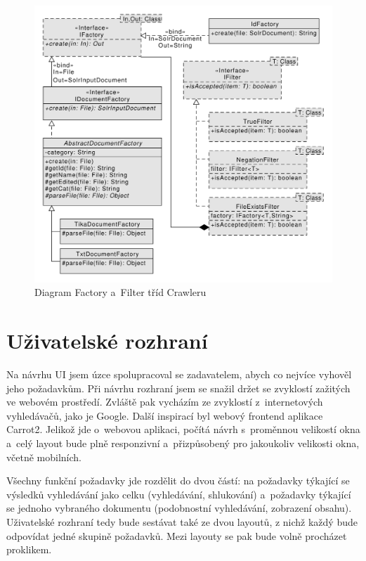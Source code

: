 \begin{figure}[h]
\begin{center}
\includegraphics[width=13cm]{OtherClasses}
\caption{Diagram Factory a~Filter tříd Crawleru}
\label{fig:OtherClasses}
\end{center}
\end{figure}

\section{Uživatelské rozhraní} \label{design_frontend}
Na návrhu UI jsem úzce spolupracoval se zadavatelem, abych co nejvíce vyhověl jeho požadavkům. Při návrhu rozhraní jsem se snažil držet se zvyklostí zažitých ve webovém prostředí. Zvláště pak vycházím ze zvyklostí z~internetových vyhledávačů, jako je Google. Další inspirací byl webový frontend aplikace Carrot2. Jelikož jde o~webovou aplikaci, počítá návrh s~proměnnou velikostí okna a~celý layout bude plně responzivní a~přizpůsobený pro jakoukoliv velikosti okna, včetně mobilních.

Všechny funkční požadavky jde rozdělit do dvou částí: na požadavky týkající se výsledků vyhledávání jako celku (vyhledávání, shlukování) a~požadavky týkající se jednoho vybraného dokumentu (podobnostní vyhledávání, zobrazení obsahu). Uživatelské rozhraní tedy bude sestávat také ze dvou layoutů, z nichž každý bude odpovídat jedné skupině požadavků. Mezi layouty se pak bude volně procházet proklikem. 

